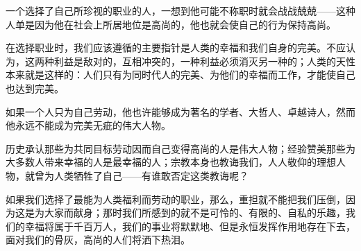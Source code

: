 \documentclass{SimpleResume}
\begin{document}
        \begin{parsCJK}
            一个选择了自己所珍视的职业的人，一想到他可能不称职时就会战战兢兢——这种人单是因为他在社会上所居地位是高尚的，他也就会使自己的行为保持高尚。

            在选择职业时，我们应该遵循的主要指针是人类的幸福和我们自身的完美。不应认为，这两种利益是敌对的，互相冲突的，一种利益必须消灭另一种的；人类的天性本来就是这样的：人们只有为同时代人的完美、为他们的幸福而工作，才能使自己也达到完美。

            如果一个人只为自己劳动，他也许能够成为著名的学者、大哲人、卓越诗人，然而他永远不能成为完美无疵的伟大人物。

            历史承认那些为共同目标劳动因而自己变得高尚的人是伟大人物；经验赞美那些为大多数人带来幸福的人是最幸福的人；宗教本身也教诲我们，人人敬仰的理想人物，就曾为人类牺牲了自己——有谁敢否定这类教诲呢？

            如果我们选择了最能为人类福利而劳动的职业，那么，重担就不能把我们压倒，因为这是为大家而献身；那时我们所感到的就不是可怜的、有限的、自私的乐趣，我们的幸福将属于千百万人，我们的事业将默默地、但是永恒发挥作用地存在下去，面对我们的骨灰，高尚的人们将洒下热泪。
        \end{parsCJK}
\end{document}
